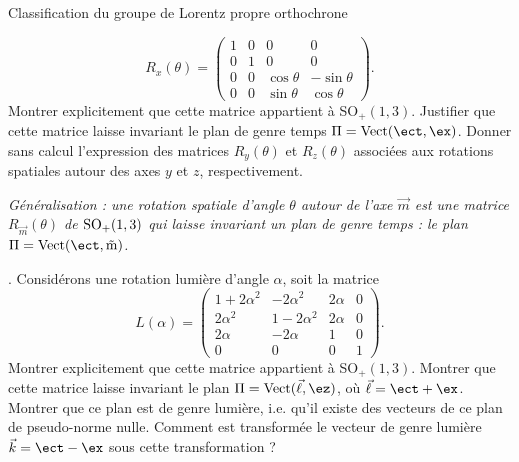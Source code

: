 \begin{exo}[PC][3][TD]{Classification du groupe de Lorentz propre orthochrone}
\begin{quest}
    \begin{equation}
      R_x(\theta) = \begin{pmatrix}
        1 & 0 & 0 & 0 \\
        0 & 1 & 0 & 0 \\
        0 & 0 & \cos \theta & -\sin \theta \\
        0 & 0 & \sin \theta & \cos \theta 
      \end{pmatrix}.
    \end{equation}
    Montrer explicitement que cette matrice appartient à SO$_+(1,3)$. Justifier que cette matrice laisse invariant le plan de genre temps $\Pi=\text{Vect}(\ect,\ex)$. Donner sans calcul l'expression des matrices $R_y(\theta)$ et $R_z(\theta)$ associées aux rotations spatiales autour des axes $y$ et $z$, respectivement.

    \begin{center}
      \emph{Généralisation : une rotation spatiale d'angle $\theta$ autour de l'axe $\Vec{m}$ est une matrice $R_{\Vec{m}}(\theta)$ de ${\rm SO}_+(1,3)$ qui laisse invariant un plan de genre temps : le plan $\Pi = \rm{Vect}(\ect,\Vec{m})$.}
    \end{center}

    \item {}. Considérons une rotation lumière d'angle $\alpha$, soit la matrice
    \begin{equation}
      L(\alpha) = \begin{pmatrix}
        1 + 2\alpha^2 & -2\alpha^2 & 2\alpha & 0 \\
        2\alpha^2 & 1 - 2\alpha^2 &  2\alpha & 0 \\
        2\alpha & -2\alpha & 1 & 0 \\
        0 & 0 & 0 & 1
      \end{pmatrix}.
    \end{equation}
    Montrer explicitement que cette matrice appartient à SO$_+(1,3)$. Montrer que cette matrice laisse invariant le plan  $\Pi=\text{Vect}(\Vec{\ell},\ez)$, où $\Vec{\ell} = \ect + \ex$. Montrer que ce plan est de genre lumière, i.e. 
    qu'il existe des vecteurs de ce plan de pseudo-norme nulle. Comment est transformée le vecteur de genre lumière $\Vec{k} = \ect - \ex$ sous cette transformation ?


\end{quest}
\end{exo}

